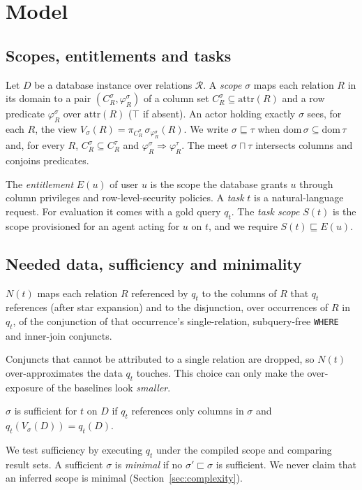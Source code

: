 \section{Model}
\label{sec:model}

\subsection{Scopes, entitlements and tasks}
Let $D$ be a database instance over relations $\mathcal{R}$. A \emph{scope} $\sigma$ maps each relation
$R$ in its domain to a pair $(C^\sigma_R,\varphi^\sigma_R)$ of a column set $C^\sigma_R\subseteq
\mathrm{attr}(R)$ and a row predicate $\varphi^\sigma_R$ over $\mathrm{attr}(R)$ ($\top$ if absent). An
actor holding exactly $\sigma$ sees, for each $R$, the view $V_\sigma(R)=\pi_{C^\sigma_R}\,
\sigma_{\varphi^\sigma_R}(R)$. We write $\sigma\sqsubseteq\tau$ when $\mathrm{dom}\,\sigma\subseteq
\mathrm{dom}\,\tau$ and, for every $R$, $C^\sigma_R\subseteq C^\tau_R$ and
$\varphi^\sigma_R\Rightarrow\varphi^\tau_R$. The meet $\sigma\sqcap\tau$ intersects columns and conjoins
predicates.

The \emph{entitlement} $E(u)$ of user $u$ is the scope the database grants $u$ through column privileges and
row-level-security policies. A \emph{task} $t$ is a natural-language request. For evaluation it comes with
a gold query $q_t$. The \emph{task scope} $S(t)$ is the scope provisioned for an agent acting for $u$ on
$t$, and we require $S(t)\sqsubseteq E(u)$.

\subsection{Needed data, sufficiency and minimality}
\begin{definition}
$N(t)$ maps each relation $R$ referenced by $q_t$ to the columns of $R$ that $q_t$ references (after
star expansion) and to the disjunction, over occurrences of $R$ in $q_t$, of the conjunction of that
occurrence's single-relation, subquery-free \texttt{WHERE} and inner-join conjuncts.
\end{definition}
Conjuncts that cannot be attributed to a single relation are dropped, so $N(t)$ over-approximates the data
$q_t$ touches. This choice can only make the over-exposure of the baselines look \emph{smaller}.

\begin{definition}[Sufficiency]
$\sigma$ is sufficient for $t$ on $D$ if $q_t$ references only columns in $\sigma$ and
$q_t(V_\sigma(D))=q_t(D)$.
\end{definition}
We test sufficiency by executing $q_t$ under the compiled scope and comparing result sets. A sufficient
$\sigma$ is \emph{minimal} if no $\sigma'\sqsubset\sigma$ is sufficient. We never claim that an inferred
scope is minimal (Section~\ref{sec:complexity}).

